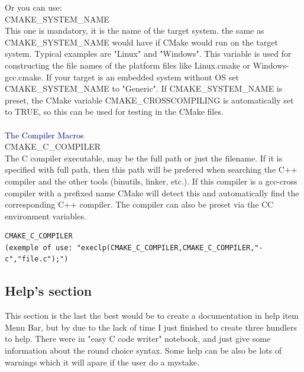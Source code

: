 \documentclass[11pt]{sample}
\begin{document}
\newpage
Or you can use:\\
CMAKE\_SYSTEM\_NAME \\
    This one is mandatory, it is the name of the target system. the same as CMAKE\_SYSTEM\_NAME would have if CMake would run on the target system. Typical examples are "Linux" and "Windows". This variable is used for constructing the file names of the platform files like Linux.cmake or Windows-gcc.cmake. If your target is an embedded system without OS set CMAKE\_SYSTEM\_NAME to "Generic". If CMAKE\_SYSTEM\_NAME is preset, the CMake variable CMAKE\_CROSSCOMPILING is automatically set to TRUE, so this can be used for testing in the CMake files. \\\\
\textcolor{Navy}{The Compiler Macros\footnotemark}\\
CMAKE\_C\_COMPILER \\
    The C compiler executable, may be the full path or just the filename. If it is specified with full path, then this path will be prefered when searching the C++ compiler and the other tools (binutils, linker, etc.). If this compiler is a gcc-cross compiler with a prefixed name CMake will detect this and automatically find the corresponding C++ compiler. The compiler can also be preset via the CC environment variables. 
\begin{verbatim}
CMAKE_C_COMPILER
(exemple of use: "execlp(CMAKE_C_COMPILER,CMAKE_C_COMPILER,"-c","file.c");")
\end{verbatim}

\subsection{Help's section}
This section is the last the best would be to create a documentation in help item Menu Bar, but by due to the lack of time I just finished to create three hundlers to help. There were in "easy C code writer" notebook, and just give some information about the round choice syntax. Some help can be also be lots of warnings which it will apare if the user do a mystake.
\newpage
\end{document}
